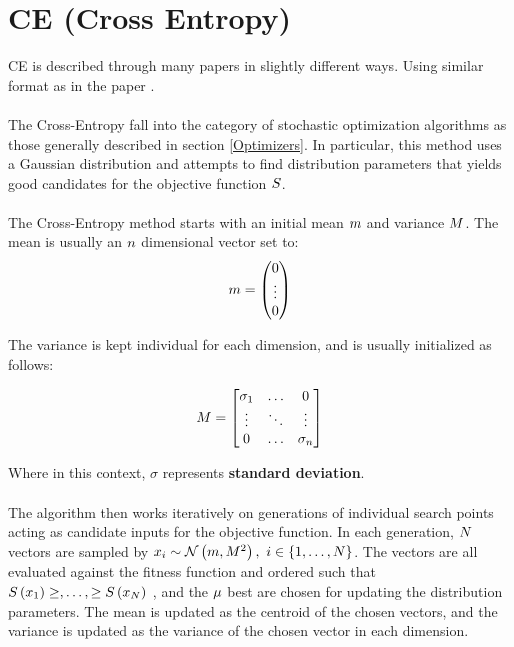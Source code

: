 \section{CE (Cross Entropy)}
CE is described through many papers in 
slightly different ways. Using similar 
format as in the paper \citep{thiery:09}.\\
\\
The Cross-Entropy fall into the category of stochastic 
optimization algorithms
as those generally described in 
section \ref{Optimizers}. In particular, this 
method uses a Gaussian distribution and 
attempts to find distribution parameters 
that yields good candidates for the 
objective function $S$.\\
\\
The Cross-Entropy method starts with an initial 
mean $m$ and variance $M$. 
The mean is usually an $n$ dimensional vector
set to:
\begin{align*}
m = \begin{pmatrix}
0\\
\vdots\\
0
\end{pmatrix} 
\end{align*}

The variance is kept individual for each dimension, 
and is usually initialized as follows:

\begin{align*}
M =
\begin{bmatrix}
\sigma_1 & \hdots & 0\\
\vdots & \ddots & \vdots\\
0 & \hdots & \sigma_{n}
\end{bmatrix}
\end{align*}

Where in this context, $\sigma$ represents \textbf{standard deviation}.\\
\\
The algorithm then works iteratively on generations of individual
search points acting as candidate inputs for the objective function.
In each generation, $N$ vectors are sampled by 
$x_{i} \sim \mathcal{N} \left(m, M^{2} \right)
,\ i \in \{1,\dots,N \}$. The vectors are all evaluated 
against the fitness function and ordered such that $S \left( x_{1} \right) \geq, \dots, \geq S \left( x_{N} \right)$
, and the $\mu$ best are chosen for updating the distribution 
parameters. The mean is updated as the centroid of the chosen vectors, and
the variance is updated as the variance of the chosen vector in each 
dimension.\\

